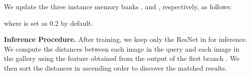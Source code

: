\documentclass[10pt,twocolumn,letterpaper]{article}
\newcommand{\myparagraph}[1]{\noindent\textbf{#1.}}
\begin{document}
We update the three instance memory banks ,  and , respectively, as follows:

where  is set as 0.2 by default.



\myparagraph{Inference Procedure} 
After training, we keep only the ResNet  in for inference. 
We compute the distances between each image in the query and each image in the gallery using the feature obtained from the output of the first branch . We then sort the distances in ascending order to discover the matched results. 


\begin{table*}[!htb]

\vspace{3pt}
\small
\begin{center}

\end{center}
\vspace{-8pt}
\caption{Long-term Person Re-ID Datasets details.}
\label{tab:dataset}
\end{table*}
\end{document}
